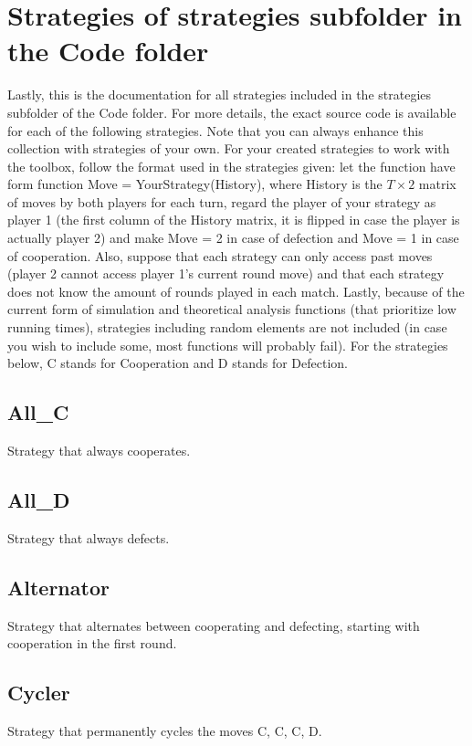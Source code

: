 \section{Strategies of strategies subfolder in the Code folder}
Lastly, this is the documentation for all strategies included in the strategies subfolder of the Code folder. For more details, the exact source code is available for each of the following strategies. Note that you can always enhance this collection with strategies of your own. For your created strategies to work with the toolbox, follow the format used in the strategies given: let the function have form function Move = YourStrategy(History), where History is the $T \times 2$ matrix of moves by both players for each turn, regard the player of your strategy as player 1 (the first column of the History matrix, it is flipped in case the player is actually player 2) and make Move = 2 in case of defection and Move = 1 in case of cooperation. Also, suppose that each strategy can only access past moves (player 2 cannot access player 1's current round move) and that each strategy does not know the amount of rounds played in each match. Lastly, because of the current form of simulation and theoretical analysis functions (that prioritize low running times), strategies including random elements are not included (in case you wish to include some, most functions will probably fail). For the strategies below, C stands for Cooperation and D stands for Defection.

\subsection{All\_C}
Strategy that always cooperates.

\subsection{All\_D}
Strategy that always defects.

\subsection{Alternator}
Strategy that alternates between cooperating and defecting, starting with cooperation in the first round.

\subsection{Cycler}
Strategy that permanently cycles the moves C, C, C, D.

